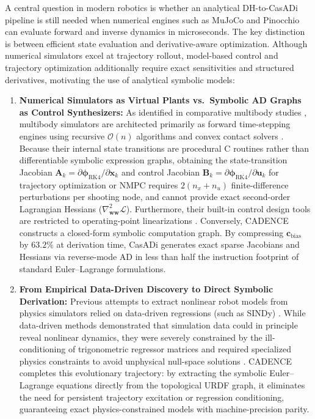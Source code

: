 \documentclass[fleqn,10pt]{article}
\begin{document}
A central question in modern robotics is whether an analytical DH-to-CasADi pipeline is still needed when numerical engines such as MuJoCo and Pinocchio can evaluate forward and inverse dynamics in microseconds. The key distinction is between efficient state evaluation and derivative-aware optimization. Although numerical simulators excel at trajectory rollout, model-based control and trajectory optimization additionally require exact sensitivities and structured derivatives, motivating the use of analytical symbolic models:
\begin{enumerate}
	\item \textbf{Numerical Simulators as Virtual Plants vs.\ Symbolic AD Graphs as Control Synthesizers:} As identified in comparative multibody studies \cite{todorov2012mujoco, featherstone2008rigid, carpentier2019pinocchio}, multibody simulators are architected primarily as forward time-stepping engines using recursive $\mathcal{O}(n)$ algorithms and convex contact solvers \cite{todorov2012mujoco, featherstone2008rigid}. Because their internal state transitions are procedural C routines rather than differentiable symbolic expression graphs, obtaining the state-transition Jacobian $\bm{A}_k = \partial \bm{\phi}_{\text{RK4}}/\partial \bm{x}_k$ and control Jacobian $\bm{B}_k = \partial \bm{\phi}_{\text{RK4}}/\partial \bm{u}_k$ for trajectory optimization or NMPC requires $2(n_x + n_u)$ finite-difference perturbations per shooting node, and cannot provide exact second-order Lagrangian Hessians ($\nabla_{\bm{w}\bm{w}}^2 \mathcal{L}$). Furthermore, their built-in control design tools are restricted to operating-point linearizations \cite{carpentier2018analytical, andersson2019casadi}. Conversely, CADENCE constructs a closed-form symbolic computation graph. By compressing $\mathbf{c}_{\text{bias}}$ by $63.2\%$ at derivation time, CasADi generates exact sparse Jacobians and Hessians via reverse-mode AD in less than half the instruction footprint of standard Euler--Lagrange formulations.
	\item \textbf{From Empirical Data-Driven Discovery to Direct Symbolic Derivation:} Previous attempts to extract nonlinear robot models from physics simulators relied on data-driven regressions (such as SINDy) \cite{omar2022framework, asker2024physics}. While data-driven methods demonstrated that simulation data could in principle reveal nonlinear dynamics, they were severely constrained by the ill-conditioning of trigonometric regressor matrices and required specialized physics constraints to avoid unphysical null-space solutions \cite{omar2022framework, asker2024physics}. CADENCE completes this evolutionary trajectory: by extracting the symbolic Euler--Lagrange equations directly from the topological URDF graph, it eliminates the need for persistent trajectory excitation or regression conditioning, guaranteeing exact physics-constrained models with machine-precision parity.

\end{enumerate}
\end{document}
